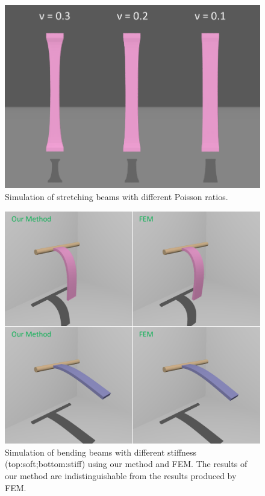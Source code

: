 \begin{figure}[t]
  \centering
  \includegraphics[width=\linewidth]{../figs/compare_different_poisson_ratio.png}
  \caption{\label{fig:8}
  Simulation of stretching beams with different Poisson ratios.
}
\end{figure}
\begin{figure}[t]
  \centering
  \includegraphics[width=\linewidth]{../figs/demo_strip_vs_fem.png}
  \caption{\label{fig:9}
  Simulation of bending beams with different stiffness (top:soft;bottom:stiff) using our method and FEM. The results of our method are indistinguishable from the results produced by FEM.
}
\end{figure}
